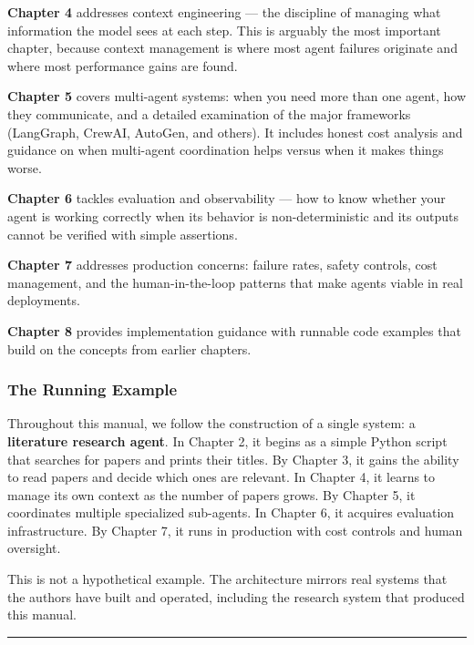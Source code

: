 \documentclass[11pt, a4paper]{article}
\begin{document}
\textbf{Chapter 4} addresses context engineering --- the discipline of
managing what information the model sees at each step. This is arguably
the most important chapter, because context management is where most
agent failures originate and where most performance gains are found.

\textbf{Chapter 5} covers multi-agent systems: when you need more than
one agent, how they communicate, and a detailed examination of the major
frameworks (LangGraph, CrewAI, AutoGen, and others). It includes honest
cost analysis and guidance on when multi-agent coordination helps versus
when it makes things worse.

\textbf{Chapter 6} tackles evaluation and observability --- how to know
whether your agent is working correctly when its behavior is
non-deterministic and its outputs cannot be verified with simple
assertions.

\textbf{Chapter 7} addresses production concerns: failure rates, safety
controls, cost management, and the human-in-the-loop patterns that make
agents viable in real deployments.

\textbf{Chapter 8} provides implementation guidance with runnable code
examples that build on the concepts from earlier chapters.

\hypertarget{the-running-example}{%
\subsubsection{The Running Example}\label{the-running-example}}

Throughout this manual, we follow the construction of a single system: a
\textbf{literature research agent}. In Chapter 2, it begins as a simple
Python script that searches for papers and prints their titles. By
Chapter 3, it gains the ability to read papers and decide which ones are
relevant. In Chapter 4, it learns to manage its own context as the
number of papers grows. By Chapter 5, it coordinates multiple
specialized sub-agents. In Chapter 6, it acquires evaluation
infrastructure. By Chapter 7, it runs in production with cost controls
and human oversight.

This is not a hypothetical example. The architecture mirrors real
systems that the authors have built and operated, including the research
system that produced this manual.

\begin{center}\rule{0.5\linewidth}{0.5pt}\end{center}
\end{document}
